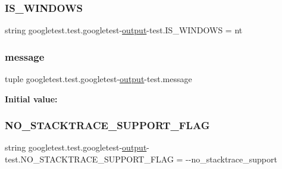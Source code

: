 \subsubsection{\texorpdfstring{IS\_WINDOWS}{IS\_WINDOWS}}
{\footnotesize\ttfamily string googletest.\+test.\+googletest-\/\mbox{\hyperlink{namespacegoogletest_1_1test_1_1googletest-output-test_a6773c2217ae4694b4db5610620562437}{output}}-\/test.\+I\+S\+\_\+\+W\+I\+N\+D\+O\+WS = \textquotesingle{}nt\textquotesingle{}}

\mbox{\label{namespacegoogletest_1_1test_1_1googletest-output-test_a2ccb426013ff32550cc6a34a73cc9eaf}} 
\subsubsection{\texorpdfstring{message}{message}}
{\footnotesize\ttfamily tuple googletest.\+test.\+googletest-\/\mbox{\hyperlink{namespacegoogletest_1_1test_1_1googletest-output-test_a6773c2217ae4694b4db5610620562437}{output}}-\/test.\+message}

{\bfseries Initial value\+:}
\begin{DoxyCode}{0}

\end{DoxyCode}
\mbox{\label{namespacegoogletest_1_1test_1_1googletest-output-test_a6d6b31f6d4a75dc726bf1d7b21a1b89e}} 
\subsubsection{\texorpdfstring{NO\_STACKTRACE\_SUPPORT\_FLAG}{NO\_STACKTRACE\_SUPPORT\_FLAG}}
{\footnotesize\ttfamily string googletest.\+test.\+googletest-\/\mbox{\hyperlink{namespacegoogletest_1_1test_1_1googletest-output-test_a6773c2217ae4694b4db5610620562437}{output}}-\/test.\+N\+O\+\_\+\+S\+T\+A\+C\+K\+T\+R\+A\+C\+E\+\_\+\+S\+U\+P\+P\+O\+R\+T\+\_\+\+F\+L\+AG = \textquotesingle{}-\/-\/no\+\_\+stacktrace\+\_\+support\textquotesingle{}}

